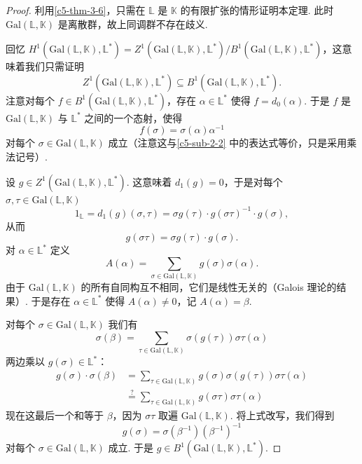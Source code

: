 \begin{proof}
利用\autoref{c5-thm-3-6}，只需在 $\mathbb{L}$ 是 $\mathbb{K}$ 的有限扩张的情形证明本定理. 此时 $\mathrm{Gal}(\mathbb{L},\mathbb{K})$ 是离散群，故上同调群不存在歧义.

回忆 $H^1(\mathrm{Gal}(\mathbb{L},\mathbb{K}),\mathbb{L}^*)=Z^1(\mathrm{Gal}(\mathbb{L},\mathbb{K}),\mathbb{L}^*)/B^1(\mathrm{Gal}(\mathbb{L},\mathbb{K}),\mathbb{L}^*)$，这意味着我们只需证明
\[
Z^1(\mathrm{Gal}(\mathbb{L},\mathbb{K}),\mathbb{L}^*)\subseteq B^1(\mathrm{Gal}(\mathbb{L},\mathbb{K}),\mathbb{L}^*).
\]
注意对每个 $f\in B^1(\mathrm{Gal}(\mathbb{L},\mathbb{K}),\mathbb{L}^*)$，存在 $\alpha\in\mathbb{L}^*$ 使得 $f=d_0(\alpha)$. 于是 $f$ 是 $\mathrm{Gal}(\mathbb{L},\mathbb{K})$ 与 $\mathbb{L}^*$ 之间的一个态射，使得
\[
f(\sigma)=\sigma(\alpha)\alpha^{-1}
\]
对每个 $\sigma\in\mathrm{Gal}(\mathbb{L},\mathbb{K})$ 成立（注意这与\autoref{c5-sub-2-2} 中的表达式等价，只是采用乘法记号）.

设 $g\in Z^1(\mathrm{Gal}(\mathbb{L},\mathbb{K}),\mathbb{L}^*)$. 这意味着 $d_1(g)=0$，于是对每个 $\sigma,\tau\in\mathrm{Gal}(\mathbb{L},\mathbb{K})$
\[
1_{\mathbb{L}}=d_1(g)(\sigma,\tau)=\sigma g(\tau)\cdot g(\sigma\tau)^{-1}\cdot g(\sigma),
\]
从而
\begin{equation}\label{c5-eq-7}
g(\sigma\tau)=\sigma g(\tau)\cdot g(\sigma).
\end{equation}
对 $\alpha\in\mathbb{L}^*$ 定义
\[
A(\alpha)=\sum_{\sigma\in\mathrm{Gal}(\mathbb{L},\mathbb{K})}g(\sigma)\sigma(\alpha).
\]
由于 $\mathrm{Gal}(\mathbb{L},\mathbb{K})$ 的所有自同构互不相同，它们是线性无关的（Galois 理论的结果）. 于是存在 $\alpha\in\mathbb{L}^*$ 使得 $A(\alpha)\neq 0$，记 $A(\alpha)=\beta$.

对每个 $\sigma\in\mathrm{Gal}(\mathbb{L},\mathbb{K})$ 我们有
\[
\sigma(\beta)=\sum_{\tau\in\mathrm{Gal}(\mathbb{L},\mathbb{K})}\sigma(g(\tau))\sigma\tau(\alpha)
\]
两边乘以 $g(\sigma)\in\mathbb{L}^*$：
\[
\begin{aligned}
g(\sigma)\cdot\sigma(\beta)&=\sum_{\tau\in\mathrm{Gal}(\mathbb{L},\mathbb{K})}g(\sigma)\sigma(g(\tau))\sigma\tau(\alpha)\\
&\overset{?}{=}\sum_{\tau\in\mathrm{Gal}(\mathbb{L},\mathbb{K})}g(\sigma\tau)\sigma\tau(\alpha)
\end{aligned}
\]
现在这最后一个和等于 $\beta$，因为 $\sigma\tau$ 取遍 $\mathrm{Gal}(\mathbb{L},\mathbb{K})$. 将上式改写，我们得到
\[
g(\sigma)=\sigma(\beta^{-1})(\beta^{-1})^{-1}
\]
对每个 $\sigma\in\mathrm{Gal}(\mathbb{L},\mathbb{K})$ 成立. 于是 $g\in B^1(\mathrm{Gal}(\mathbb{L},\mathbb{K}),\mathbb{L}^*)$.
\end{proof}

